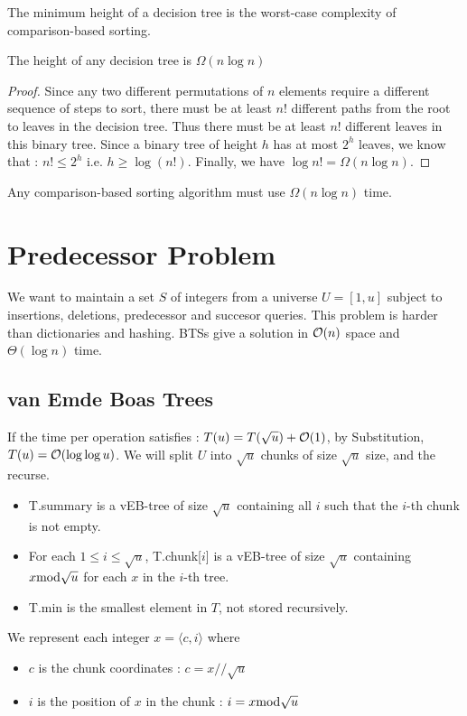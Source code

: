 \documentclass{cours}
\begin{document}
\begin{proposition}
    The minimum height of a decision tree is the worst-case complexity of comparison-based sorting. 
\end{proposition}
\begin{lemma}
    The height of any decision tree is $\Omega(n \log n)$
\end{lemma}
\begin{proof}
    Since any two different permutations of $n$ elements require a different sequence of steps to sort, there must be at least $n!$ different paths from the root to leaves in the decision tree. 
    Thus there must be at least $n!$ different leaves in this binary tree. Since a binary tree of height $h$ has at most $2^{h}$ leaves, we know that : $n! \leq 2^{h}$ i.e. $h\geq \log(n!)$. Finally, we have $\log n! = \Omega (n \log n)$.
\end{proof}
\begin{theorem}
    Any comparison-based sorting algorithm must use $\Omega(n\log n)$ time.
\end{theorem}

\section{Predecessor Problem}
We want to maintain a set $S$ of integers from a universe $U = \left[1, u\right]$ subject to insertions, deletions, predecessor and succesor queries. This problem is harder than dictionaries and hashing. BTSs give a solution in $\mathcal{O}(n)$ space and $\Theta(\log n)$ time. 

\subsection{van Emde Boas Trees}
If the time per operation satisfies : $T(u) = T(\sqrt{u}) + \mathcal{O}(1)$, by Substitution, $T(u) = \mathcal{O}(\log \log u)$. We will split $U$ into $\sqrt{u}$ chunks of size $\sqrt{u}$ size, and the recurse. 
\begin{definition}
    \begin{itemize}
        \item \textmd{T.summary} is a vEB-tree of size $\sqrt{u}$ containing all $i$ such that the $i$-th chunk is not empty. 
        \item For each $1 \leq i \leq \sqrt{u}$, \textmd{T.chunk[$i$]} is a vEB-tree of size $\sqrt{u}$ containing $x \textmd{mod} \sqrt{u}$ for each $x$ in the $i$-th tree. 
        \item \textmd{T.min} is the smallest element in $T$, not stored recursively. 
    \end{itemize}    
    We represent each integer $x = \langle c, i \rangle$ where 
    \begin{itemize}
        \item $c$ is the chunk coordinates : $c = x // \sqrt{u}$
        \item $i$ is the position of $x$ in the chunk : $i = x \textmd{mod} \sqrt{u}$
    \end{itemize}
\end{definition}
\end{document}
